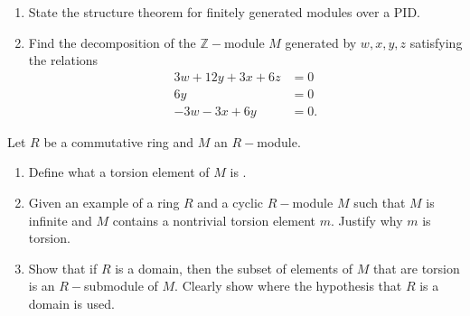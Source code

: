 \begin{problem}
\label{prob:1.1}
\begin{enumerate}
    \item State the structure theorem for finitely generated modules over a PID.
    \item Find the decomposition of the $\mathbb{Z}-$module $M$ generated by $w,x,y,z$ satisfying the relations
    \begin{align*}
        3w + 12y + 3x + 6z &=0 \\
        6y &= 0 \\
        -3w -3x + 6y &= 0.
    \end{align*}
\end{enumerate}
\end{problem}

\begin{problem}
Let $R$ be a commutative ring and $M$ an $R-$module.
\begin{enumerate}
    \item Define what a torsion element of $M$ is .
    \item Given an example of a ring $R$ and a cyclic $R-$module $M$ such that $M$ is infinite and $M$ contains a nontrivial torsion element $m$.
    Justify why $m$ is torsion.
    \item Show that if $R$ is a domain, then the subset of elements of $M$ that are torsion is an $R-$submodule of $M$. Clearly show where the hypothesis that $R$ is a domain is used.
\end{enumerate}
\label{prob:1.1}
\end{problem}